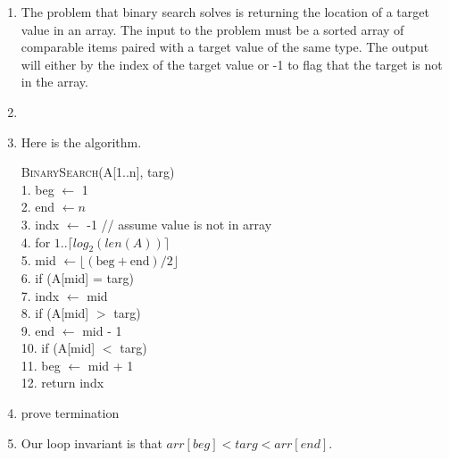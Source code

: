 \documentclass{article}
\begin{document}

\begin{enumerate}
    \item The problem that binary search solves is returning the location of a target value in an array.
    The input to the problem must be a sorted array of comparable items paired with a target value of the same type.
    The output will either by the index of the target value or -1 to flag that the target is not in the array.
    \item
    \item Here is the algorithm.
    \begin{algorithm}
    	\textsc{BinarySearch}(A[1..n], targ) \\
    	1.  \hspace{0em}   beg $\leftarrow$ 1 \\
    	2.  \hspace{0em}   end $\leftarrow n$ \\
        3.  \hspace{0em}   indx $\leftarrow$ -1 // assume value is not in array \\
    	4.  \hspace{0em}   for $1.. \lceil log_2(len(A)) \rceil$ \\
    	5.  \hspace{2em}       mid $\leftarrow \lfloor (\text{beg}+\text{end})/2 \rfloor$ \\
    	6.  \hspace{2em}	   if (A[mid] = targ) \\
    	7.  \hspace{4em}	       indx $\leftarrow$ mid \\
    	8.  \hspace{2em}	   if (A[mid] $>$ targ) \\
    	9.  \hspace{4em}		   end $\leftarrow$ mid - 1 \\
    	10. \hspace{2em}	   if (A[mid] $<$ targ) \\
        11. \hspace{4em}        beg $\leftarrow$ mid + 1 \\
        12. \hspace{0em} return indx
    \end{algorithm}
    \item prove termination
    \item Our loop invariant is that $arr[beg] < targ < arr[end]$.

\end{enumerate}
\end{document}
